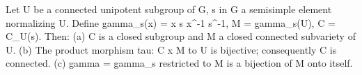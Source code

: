Let U be a connected unipotent subgroup of G, s in G a semisimple element normalizing U. Define gamma_s(x) = x s x^{-1} s^{-1}, M = gamma_s(U), C = C_U(s). Then: (a) C is a closed subgroup and M a closed connected subvariety of U. (b) The product morphism tau: C x M to U is bijective; consequently C is connected. (c) gamma = gamma_s restricted to M is a bijection of M onto itself.
